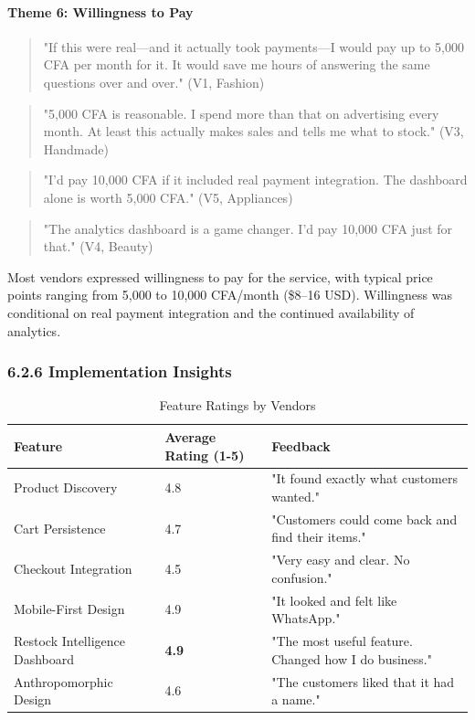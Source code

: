 \documentclass[12pt,a4paper]{article}
\begin{document}
\paragraph{Theme 6: Willingness to Pay}

\begin{quote}
"If this were real---and it actually took payments---I would pay up to 5,000 CFA per month for it. It would save me hours of answering the same questions over and over." (V1, Fashion)
\end{quote}

\begin{quote}
"5,000 CFA is reasonable. I spend more than that on advertising every month. At least this actually makes sales and tells me what to stock." (V3, Handmade)
\end{quote}

\begin{quote}
"I'd pay 10,000 CFA if it included real payment integration. The dashboard alone is worth 5,000 CFA." (V5, Appliances)
\end{quote}

\begin{quote}
"The analytics dashboard is a game changer. I'd pay 10,000 CFA just for that." (V4, Beauty)
\end{quote}

Most vendors expressed willingness to pay for the service, with typical price points ranging from 5,000 to 10,000 CFA/month (\$8--16 USD). Willingness was conditional on real payment integration and the continued availability of analytics.

\subsubsection{6.2.6 Implementation Insights}

\begin{table}[h]
\centering
\caption{Feature Ratings by Vendors}
\label{tab:feature_ratings}
\begin{tabular}{p{5cm}p{3cm}p{6cm}}
\toprule
\textbf{Feature} & \textbf{Average Rating (1-5)} & \textbf{Feedback} \\
\midrule
Product Discovery & 4.8 & "It found exactly what customers wanted." \\
Cart Persistence & 4.7 & "Customers could come back and find their items." \\
Checkout Integration & 4.5 & "Very easy and clear. No confusion." \\
Mobile-First Design & 4.9 & "It looked and felt like WhatsApp." \\
Restock Intelligence Dashboard & \textbf{4.9} & "The most useful feature. Changed how I do business." \\
Anthropomorphic Design & 4.6 & "The customers liked that it had a name." \\
\bottomrule
\end{tabular}
\end{table}
\end{document}
